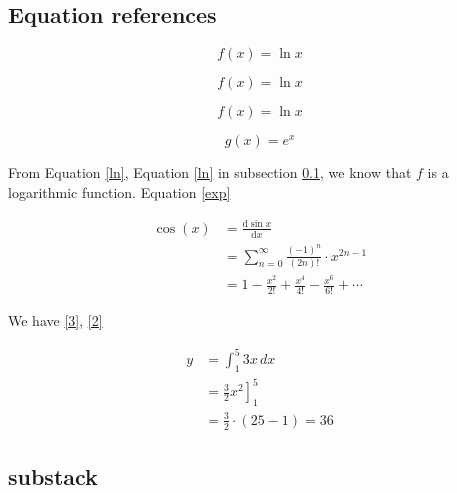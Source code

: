 \documentclass{article}
\begin{document}
\subsection{Equation references}    \label{refsect}

\begin{equation}\label{ln}
    f(x) = \ln x
\end{equation}

\begin{equation}
    f(x) = \ln x 
\end{equation}

\[
    f(x) = \ln x    
\]


\begin{equation}
    g(x) = e^x  \label{exp}
\end{equation}

From Equation \eqref{ln}, Equation \ref{ln} in subsection \ref{refsect}, we know that $f$ is a logarithmic function. Equation \eqref{exp}

\begin{align}
    \cos(x) &= \frac{\mathrm{d}\sin x}{\mathrm{d}x}\\
     &= \sum_{n=0}^\infty \frac{(-1)^n}{(2n)!}\cdot x^{2n - 1} \label{3}\\
     &= 1 - \frac{x^2}{2!} + \frac{x^4}{4!} - \frac{x^6}{6!} + \cdots \label{2}
\end{align}

We have \eqref{3}, \eqref{2}

\begin{align*}
    y &= \int_1^5 3x\, dx \\
     &= \left. \frac{3}{2}x^2 \right]_1^5 \\
     &= \frac{3}{2} \cdot (25 - 1) = 36
\end{align*}

\subsection{substack}
\end{document}
